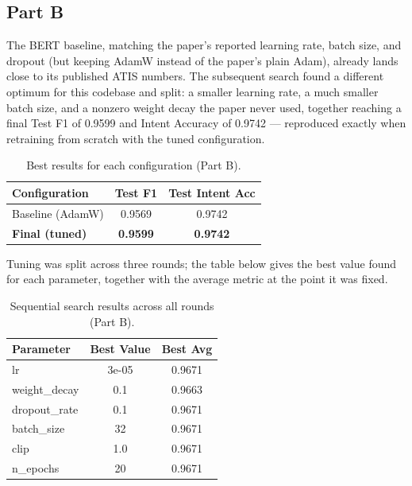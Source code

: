 \documentclass[a4paper]{article}
\begin{document}
\subsection{Part B}

The BERT baseline, matching the paper's reported learning rate, batch size, and dropout (but keeping AdamW instead of the paper's plain Adam), already lands close to its published ATIS numbers. The subsequent search found a different optimum for this codebase and split: a smaller learning rate, a much smaller batch size, and a nonzero weight decay the paper never used, together reaching a final Test F1 of 0.9599 and Intent Accuracy of 0.9742 — reproduced exactly when retraining from scratch with the tuned configuration.

\begin{table}[h]
\caption{Best results for each configuration (Part B).}
\label{tab:partb}
\centering
\begin{tabular}{lcc}
\hline
\textbf{Configuration} & \textbf{Test F1} & \textbf{Test Intent Acc} \\
\hline
Baseline (AdamW) & 0.9569 & 0.9742 \\
\textbf{Final (tuned)}                   & \textbf{0.9599} & \textbf{0.9742} \\
\hline
\end{tabular}
\end{table}

Tuning was split across three rounds; the table below gives the best value found for each parameter, together with the average metric at the point it was fixed.

\begin{table}[h]
\caption{Sequential search results across all rounds (Part B).}
\label{tab:partb-tuning}
\centering
\begin{tabular}{lcc}
\hline
\textbf{Parameter} & \textbf{Best Value} & \textbf{Best Avg} \\
\hline
lr            & 3e-05 & 0.9671 \\
weight\_decay & 0.1   & 0.9663 \\
dropout\_rate & 0.1   & 0.9671 \\
batch\_size   & 32    & 0.9671 \\
clip          & 1.0   & 0.9671 \\
n\_epochs     & 20    & 0.9671 \\
\hline
\end{tabular}
\end{table}




\end{document}
